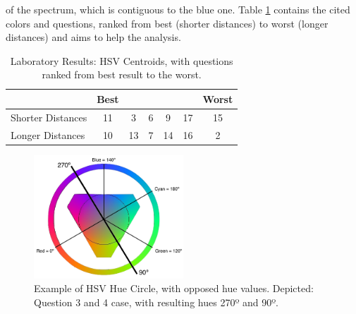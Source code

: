 of the spectrum, which is contiguous to the blue one.
%
Table \ref{table:hsvresults} contains the cited colors and questions, ranked from best (shorter distances) to worst (longer distances) and aims to help the analysis.
%
\begin{table}[htbp]
  \centering
  \begin{tabular}{@{}lcccccc@{}}
  \toprule
      & \multicolumn{1}{l}{Best}                        & \multicolumn{1}{l}{}                            & \multicolumn{1}{l}{}                           & \multicolumn{1}{l}{}                            & \multicolumn{1}{l}{}                            & \multicolumn{1}{l}{Worst}                       \\ \midrule
  \multicolumn{1}{l|}{Shorter Distances} & \multicolumn{1}{c||}{\cellcolor[HTML]{FF8000}11} & \multicolumn{1}{c||}{\cellcolor[HTML]{80FF00}3}  & \multicolumn{1}{c||}{\cellcolor[HTML]{FF8000}6} & \multicolumn{1}{c||}{\cellcolor[HTML]{00FF80}9}  & \multicolumn{1}{c||}{\cellcolor[HTML]{00FF00}17} & \multicolumn{1}{c|}{\cellcolor[HTML]{00FF80}15} \\ \midrule
  \multicolumn{1}{l|}{Longer Distances}  & \multicolumn{1}{c||}{\cellcolor[HTML]{0080FF}10} & \multicolumn{1}{c||}{\cellcolor[HTML]{0080FF}13} & \multicolumn{1}{c||}{\cellcolor[HTML]{0000FF}7} & \multicolumn{1}{c||}{\cellcolor[HTML]{8000FF}14} & \multicolumn{1}{c||}{\cellcolor[HTML]{FF007F}16} & \multicolumn{1}{c|}{\cellcolor[HTML]{FF00FF}2}  \\ \bottomrule
  \end{tabular}
  \caption[Laboratory Results: HSV Centroids]{Laboratory Results: HSV Centroids, with questions ranked from best result to the worst.}
  \label{table:hsvresults}
\end{table}
%
\begin{figure}[htbp]
  \centering
  \includegraphics[width=0.5\textwidth]{images/HSV_hue.png}
  \caption[Example of HSV Hue Circle, with opposed hue values.]{Example of HSV Hue Circle, with opposed hue values. Depicted: Question 3 and 4 case, with resulting hues 270º and 90º.}
  \label{fig:colornames_xkcd}
\end{figure}
%
